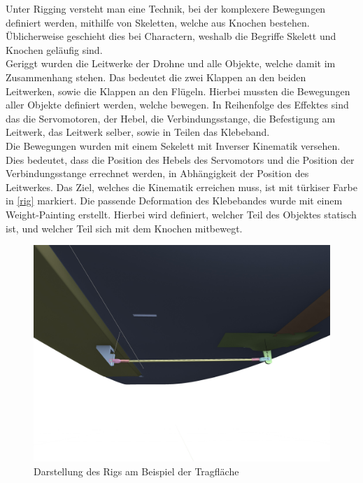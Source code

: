 Unter Rigging versteht man eine Technik, bei der komplexere Bewegungen definiert werden, mithilfe von Skeletten, welche aus Knochen bestehen. Üblicherweise geschieht dies bei Charactern, weshalb die Begriffe Skelett und Knochen geläufig sind. \cite{rigging}\\
Geriggt wurden die Leitwerke der Drohne und alle Objekte, welche damit im Zusammenhang stehen. Das bedeutet die zwei Klappen an den beiden Leitwerken, sowie die Klappen an den Flügeln. Hierbei mussten die Bewegungen aller Objekte definiert werden, welche bewegen. In Reihenfolge des Effektes sind das die Servomotoren, der Hebel, die Verbindungsstange, die Befestigung am Leitwerk, das Leitwerk selber, sowie in Teilen das Klebeband.\\
Die Bewegungen wurden mit einem Sekelett mit Inverser Kinematik versehen. Dies bedeutet, dass die Position des Hebels des Servomotors und die Position der Verbindungsstange errechnet werden, in Abhängigkeit der Position des Leitwerkes. Das Ziel, welches die Kinematik erreichen muss, ist mit türkiser Farbe in \autoref{rig} markiert. Die passende Deformation des Klebebandes wurde mit einem Weight-Painting erstellt. Hierbei wird definiert, welcher Teil des Objektes statisch ist, und welcher Teil sich mit dem Knochen mitbewegt.

\begin{figure}[H]
\begin{center}
\includegraphics[width=\textwidth]{gfx/prod/plane/plane7.jpg}
\caption{Darstellung des Rigs am Beispiel der Tragfläche}
\label{rig}
\end{center}
\end{figure}

